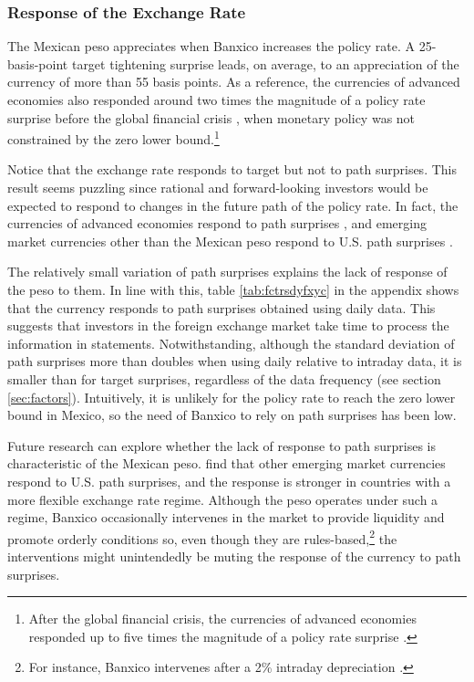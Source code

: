 {\subsubsection{Response of the Exchange Rate} \label{sec:onimpactfx}
The Mexican peso appreciates when Banxico increases the policy rate. A 25-basis-point target tightening surprise leads, on average, to an appreciation of the currency of more than 55 basis points. As a reference, the currencies of advanced economies also responded around two times the magnitude of a policy rate surprise before the global financial crisis \parencite{Rosa:2011JBF}, when monetary policy was not constrained by the zero lower bound.\footnote{After the global financial crisis, the currencies of advanced economies responded up to five times the magnitude of a policy rate surprise \parencite{FerrariKearnsSchrimpf:2021}.}

Notice that the exchange rate responds to target but not to path surprises. 
This result seems puzzling since rational and forward-looking investors would be expected to respond to changes in the future path of the policy rate. 
In fact, the currencies of advanced economies respond to path surprises \parencite{Rosa:2011JBF, FerrariKearnsSchrimpf:2021}, and emerging market currencies other than the Mexican peso respond to U.S. path surprises \parencite{HausmanWongswan:2011}. 

The relatively small variation of path surprises explains the lack of response of the peso to them. 
In line with this, table \ref{tab:fctrsdyfxyc} in the appendix shows that the currency responds to path surprises obtained using daily data. 
This suggests that investors in the foreign exchange market take time to process the information in statements. 
Notwithstanding, although the standard deviation of path surprises more than doubles when using daily relative to intraday data, it is smaller than for target surprises, regardless of the data frequency (see section \ref{sec:factors}). 
Intuitively, it is unlikely for the policy rate to reach the zero lower bound in Mexico, so the need of Banxico to rely on path surprises has been low.

Future research can explore whether the lack of response to path surprises is characteristic of the Mexican peso. 
\textcite{HausmanWongswan:2011} find that other emerging market currencies respond to U.S. path surprises, and the response is stronger in countries with a more flexible exchange rate regime. 
Although the peso operates under such a regime, Banxico occasionally intervenes in the market to provide liquidity and promote orderly conditions so, even though they are rules-based,\footnote{ For instance, Banxico intervenes after a 2\% intraday depreciation \parencite{GVZerecero:2013}.} 
the interventions might unintendedly be muting the response of the currency to path surprises. 

}

